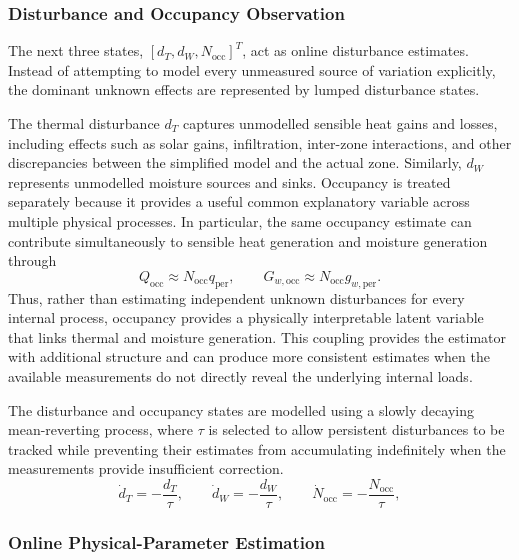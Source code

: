 \documentclass[12pt, a4paper]{article}
\begin{document}
	\subsubsection{Disturbance and Occupancy Observation}
	
	The next three states, $\left[ d_T, d_W, N_{\mathrm{occ}} \right]^T$, act as online disturbance estimates. Instead of attempting to model every unmeasured source of variation explicitly, the dominant unknown effects are represented by lumped disturbance states.
	
	The thermal disturbance $d_T$ captures unmodelled sensible heat gains and losses, including effects such as solar gains, infiltration, inter-zone interactions, and other discrepancies between the simplified model and the actual zone. Similarly, $d_W$ represents unmodelled moisture sources and sinks.	Occupancy is treated separately because it provides a useful common explanatory variable across multiple physical processes. In particular, the same occupancy estimate can contribute simultaneously to sensible heat generation and moisture generation through
	\begin{equation}
		Q_{\mathrm{occ}} \approx N_{\mathrm{occ}}q_{\mathrm{per}},
		\qquad
		G_{w,\mathrm{occ}} \approx N_{\mathrm{occ}}g_{w,\mathrm{per}}.
	\end{equation}
	Thus, rather than estimating independent unknown disturbances for every internal process, occupancy provides a physically interpretable latent variable that links thermal and moisture generation. This coupling provides the estimator with additional structure and can produce more consistent estimates when the available measurements do not directly reveal the underlying internal loads.
	
	The disturbance and occupancy states are modelled using a slowly decaying mean-reverting process, 	where $\tau$ is selected to allow persistent disturbances to be tracked while preventing their estimates from accumulating indefinitely when the measurements provide insufficient correction.
	\begin{equation}
		\dot d_T=-\frac{d_T}{\tau},
		\qquad
		\dot d_W=-\frac{d_W}{\tau},
		\qquad
		\dot N_{\mathrm{occ}}=-\frac{N_{\mathrm{occ}}}{\tau},
		\label{eq:OU_dynamics}
	\end{equation}
	
	\subsubsection{Online Physical-Parameter Estimation}
	
\end{document}
